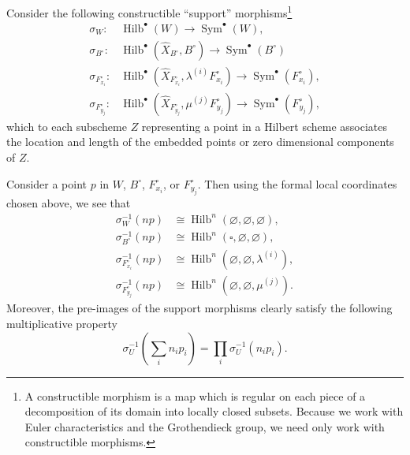 \documentclass[12pt]{amsart}
\theoremstyle{definition}
\newcommand{\Sym}{\operatorname{Sym}}
\newcommand{\Hilb}{\operatorname{Hilb}}
\renewcommand{\emptyset}{\varnothing}
\newcommand{\Xhat}{\widehat{X}}
\newcommand{\bx}{\square}
\begin{document}
Consider the following constructible ``support'' morphisms\footnote{A
constructible morphism is a map which is regular on each piece of a
decomposition of its domain into locally closed subsets. Because we
work with Euler characteristics and the Grothendieck group, we need
only work with constructible morphisms.}
\begin{align*}
\sigma_{W}:& \Hilb^{\bullet}(W) \to \Sym^{\bullet}(W),\\
\sigma_{B^{\circ }}:& \Hilb^{\bullet}(\Xhat_{B^{\circ}},B^{\circ}) \to \Sym^{\bullet}(B^{\circ })\\
\sigma_{F_{x_{i}}^{\circ }}:& \Hilb^{\bullet}(\Xhat_{F_{x_{i}}^{\circ}},\lambda^{(i)}F_{x_{i}}^{\circ}) \to \Sym^{\bullet}(F_{x_{i}}^{\circ }),\\
\sigma_{F_{y_{j}}^{\circ }}:& \Hilb^{\bullet}(\Xhat_{F_{y_{j}}^{\circ}},\mu^{(j)}F_{y_{j}}^{\circ}) \to \Sym^{\bullet}(F_{y_{j}}^{\circ }),
\end{align*}
which to each subscheme $Z$ representing a point in a Hilbert scheme
associates the location and length of the embedded points or zero
dimensional components of $Z$. 

Consider a point $p$ in $W$, $B^{\circ}$, $F_{x_{i}}^{\circ }$, or
$F_{y_{j}}^{\circ}$. Then using the formal local coordinates chosen
above, we see that 
\begin{align*}
\sigma_{W}^{-1}(np) &\cong \Hilb^{n}\left(\emptyset ,\emptyset,\emptyset \right), \\
\sigma_{B^{\circ }}^{-1}(np) &\cong \Hilb^{n}\left(\bx ,\emptyset ,\emptyset \right), \\
\sigma_{F_{x_{i}}^{\circ }}^{-1}(np) &\cong \Hilb^{n}\left(\emptyset  ,\emptyset,\lambda^{(i)}  \right), \\
\sigma_{F_{y_{j}}^{\circ }}^{-1}(np) &\cong \Hilb^{n}\left(\emptyset
,\emptyset,\mu^{(j)} \right).
\end{align*}
Moreover, the pre-images of the support morphisms clearly satisfy the
following multiplicative property
\[
\sigma^{-1}_{U}\left(\sum_{i}n_{i}p_{i} \right) = \prod_{i}
\sigma^{-1}_{U}\left(n_{i}p_{i} \right).
\]
\end{document}

